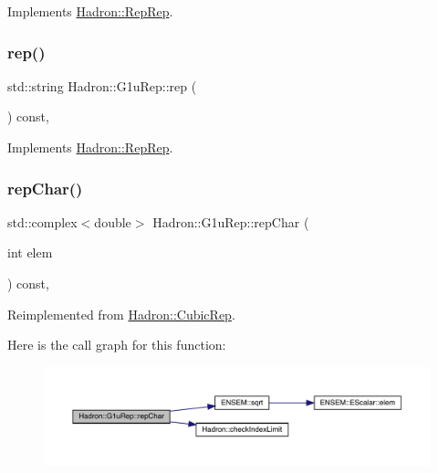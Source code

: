Implements \mbox{\hyperlink{structHadron_1_1RepRep_ab3213025f6de249f7095892109575fde}{Hadron\+::\+Rep\+Rep}}.

\mbox{\label{structHadron_1_1G1uRep_a3c25822b246f892ed1eef8aeb4ae8252}} 
\subsubsection{\texorpdfstring{rep()}{rep()}\hspace{0.1cm}{\footnotesize\ttfamily [5/5]}}
{\footnotesize\ttfamily std\+::string Hadron\+::\+G1u\+Rep\+::rep (\begin{DoxyParamCaption}{ }\end{DoxyParamCaption}) const\hspace{0.3cm}{\ttfamily [inline]}, {\ttfamily [virtual]}}



Implements \mbox{\hyperlink{structHadron_1_1RepRep_ab3213025f6de249f7095892109575fde}{Hadron\+::\+Rep\+Rep}}.

\mbox{\label{structHadron_1_1G1uRep_a3d37407f93af4c955c024aafa0948bcb}} 
\subsubsection{\texorpdfstring{repChar()}{repChar()}\hspace{0.1cm}{\footnotesize\ttfamily [1/3]}}
{\footnotesize\ttfamily std\+::complex$<$double$>$ Hadron\+::\+G1u\+Rep\+::rep\+Char (\begin{DoxyParamCaption}\item[{int}]{elem }\end{DoxyParamCaption}) const\hspace{0.3cm}{\ttfamily [inline]}, {\ttfamily [virtual]}}



Reimplemented from \mbox{\hyperlink{structHadron_1_1CubicRep_af45227106e8e715e84b0af69cd3b36f8}{Hadron\+::\+Cubic\+Rep}}.

Here is the call graph for this function\+:
\nopagebreak
\begin{figure}[H]
\begin{center}
\leavevmode
\includegraphics[width=350pt]{d8/d42/structHadron_1_1G1uRep_a3d37407f93af4c955c024aafa0948bcb_cgraph}
\end{center}
\end{figure}
\mbox{\label{structHadron_1_1G1uRep_a3d37407f93af4c955c024aafa0948bcb}} 
